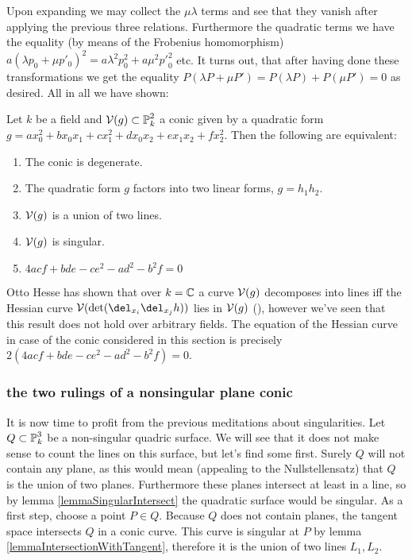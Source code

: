 Upon expanding we may collect the $\mu\lambda$ terms and see that they vanish after applying the previous three relations.
Furthermore the quadratic terms we have the equality (by means of the Frobenius homomorphism)
$a(\lambda p_0 + \mu p'_0)^2 = a\lambda^2p_0^2 + a \mu^2 {p'}_0^2$ etc.
It turns out, that after having done these transformations we get the equality $P(\lambda P + \mu P') = P(\lambda P) + P(\mu P') = 0$ as desired.
All in all we have shown:

\begin{theorem}
Let $k$ be a field and $\operatorname{\mathcal V}(g) \subset \operatorname{\mathbb P}^2_k$ a conic given by a quadratic form $g = ax_0^2 + bx_0x_1 + cx_1^2 + dx_0x_2 + ex_1x_2 + fx_2^2$.
Then the following are equivalent:
\begin{enumerate}
\item The conic is degenerate.
\item The quadratic form $g$ factors into two linear forms, $g=h_1h_2$.
\item $\operatorname{\mathcal V}(g)$ is a union of two lines.
\item $\operatorname{\mathcal V}(g)$ is singular.
\item $4acf + bde - ce^2 - ad^2 - b^2f = 0$
\end{enumerate}
\end{theorem}


\begin{remark}
Otto Hesse has shown that over $k=\operatorname{\mathbb C}$ a curve $\operatorname{\mathcal V}(g)$ decomposes into lines iff the Hessian curve $\V(\det(\del_{x_i}\del_{x_j}h))$ lies in $\operatorname{\mathcal V}(g)$ (\cite[p.289]{brieskorn2012plane}), however we've seen that this result does not hold over arbitrary fields.
The equation of the Hessian curve in case of the conic considered in this section is precisely $2(4acf + bde - ce^2 - ad^2 - b^2f) = 0$.
\end{remark}


\subsubsection{the two rulings of a nonsingular plane conic}


It is now time to profit from the previous meditations about singularities.
Let $Q \subset \operatorname{\mathbb P}^3_k$ be a non-singular quadric surface.
We will see that it does not make sense to count the lines on this surface, but let's find some first.
Surely $Q$ will not contain any plane, as this would mean (appealing to the Nullstellensatz) that $Q$ is the union of two planes.
Furthermore these planes intersect at least in a line, so by lemma \ref{lemmaSingularIntersect} the quadratic surface would be singular.
As a first step, choose a point $P \in Q$.
Because $Q$ does not contain planes, the tangent space intersects $Q$ in a conic curve.
This curve is singular at $P$ by lemma \ref{lemmaIntersectionWithTangent}, therefore it is the union of two lines $L_1,L_2$.
